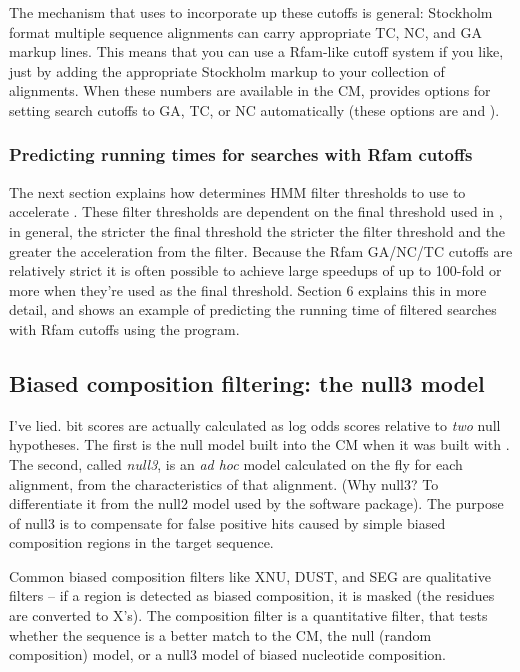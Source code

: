 The mechanism that  uses to incorporate up these cutoffs is
general: Stockholm format multiple sequence alignments can carry
appropriate TC, NC, and GA markup lines. This means that you can use a
Rfam-like cutoff system if you like, just by adding the appropriate
Stockholm markup to your collection of alignments. When these numbers
are available in the CM,  provides options
for setting search cutoffs to GA, TC, or NC automatically (these options
are  and ).

\subsubsection{Predicting running times for searches with Rfam cutoffs}
The next section explains how  determines HMM filter
thresholds to use to accelerate . These filter
thresholds are dependent on the final threshold used in
, in general, the stricter the final threshold the
stricter the filter threshold and the greater the acceleration from
the filter. Because the Rfam GA/NC/TC cutoffs are relatively strict it
is often possible to achieve large speedups of up to 100-fold or more
when they're used as the final threshold. Section 6 explains this in
more detail, and shows an example of predicting the running time of
filtered searches with Rfam cutoffs using the  program.

\subsection{Biased composition filtering: the null3 model}

I've lied.  bit scores are actually calculated as
log odds scores relative to \emph{two} null hypotheses. The first is the null model
built into the CM when it was built with .
The second, called \emph{null3}, is an \emph{ad hoc} model calculated
on the fly for each alignment, from the characteristics of that
alignment. (Why null3? To differentiate it from the null2 model used
by the  software package). The purpose of null3 is to
compensate for false positive hits caused by simple biased composition
regions in the target sequence.

Common biased composition filters like XNU, DUST, and SEG are
qualitative filters -- if a region is detected as biased composition,
it is masked (the residues are converted to X's).  The
 composition filter is a quantitative filter, that
tests whether the sequence is a better match to the CM, the
null (random composition) model, or a null3 model of biased nucleotide
composition.

